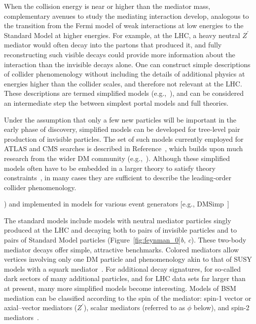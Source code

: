 \documentclass{ar-1col}
\newcommand{\IP}{invisible particle}
\newcommand{\Zprime}{\ensuremath{{Z}^\prime}\xspace}
\begin{document}
{When the collision energy is near or higher than the mediator
mass, complementary avenues to study the mediating interaction
develop, analogous to the transition from the Fermi model of weak
interactions at low energies to the Standard Model at higher
energies. For example, at the LHC, a heavy neutral \Zprime
mediator would often decay into the partons that produced it, and
fully reconstructing such visible decays could provide more
information about the interaction than the invisible decays alone.
One can construct simple descriptions of collider phenomenology without 
including the details of additional physics at energies higher than 
the collider scales, and therefore not relevant at the LHC.
These descriptions are termed simplified models
(e.g.,~),
and can be considered an intermediate step the between simplest portal
models and full theories. 

Under the assumption that only a few new particles
will be important in the early phase of discovery, 
simplified models can be developed for tree-level pair production of {\IP}s. The set of such models
currently employed for ATLAS and CMS searches is described in
Reference~, which builds upon much research from
the wider DM community
(e.g.,~). Although these simplified
models often have to be embedded in a larger theory to satisfy theory
constraints~\cite{Kahlhoefer:2015bea}, in many cases they are sufficient to
describe the leading-order collider phenomenology.

\begin{marginnote}[]
)
and implemented in models for various event generators [e.g.,
DMSimp~\cite{Backovic:2015soa}]
\end{marginnote}

The standard models include models with neutral mediator particles
singly produced at the LHC and decaying both to pairs of {\IP}s and to
pairs of Standard Model particles (Figure~\ref{fig:feynman_0}{\em b},{\em
c}). These two-body mediator decays offer simple, attractive benchmarks.
Colored mediators allow vertices involving only one DM particle
and phenomenology akin to that of SUSY models with a squark
mediator~\cite{Papucci:2014iwa,An:2013xka,Bell:2012rg}.
For additional decay signatures, for so-called dark sectors of many
additional particles, and for LHC data sets far larger than at
present, many more simplified models become interesting.
Models of BSM mediation can be classified according to the spin of
the mediator: spin-1 vector or axial--vector mediators (\Zprime),
scalar mediators (referred to as $\phi$ below), and spin-2
mediators~\cite{Han:2015cty}.


}
\end{document}
